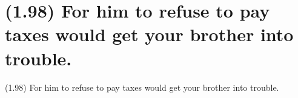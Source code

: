 \documentclass{article}
\begin{document}
\clearpage

%
%

\section*{(1.98) For him to refuse to pay taxes would get your brother into trouble.}

\bigbreak
\begin{enumerate*}
\item[(1.98)] For him to refuse to pay taxes would get your brother into trouble.
\end{enumerate*}
\bigbreak
\end{document}
